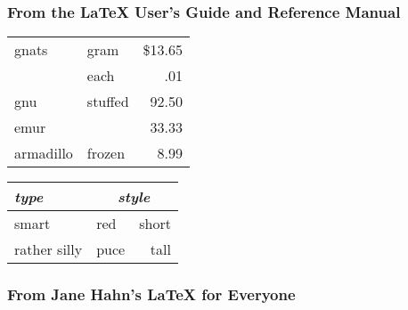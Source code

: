 \documentclass{article}
\begin{document}
\subsubsection{From the \LaTeX{} User's Guide and Reference Manual}

\begin{center}
\begin{tabular}{||l|lr||}
\hline
gnats & gram & \$13.65 \\ \cline{2-3}
& each & .01 \\ \hline
gnu & stuffed & 92.50 \\ \cline{1-1}\cline{3-3}
emur &  & 33.33 \\ \hline
armadillo & frozen & 8.99 \\ \hline
\end{tabular}

\begin{tabular}{|l|l|r|}
\hline\hline
\emph{type} & \multicolumn{2}{c|}{\emph{style}} \\ \hline
smart & red & short \\ 
rather silly & puce & tall \\ \hline\hline
\end{tabular}
\end{center}

\subsubsection{From Jane Hahn's \LaTeX{} for Everyone}
\end{document}
